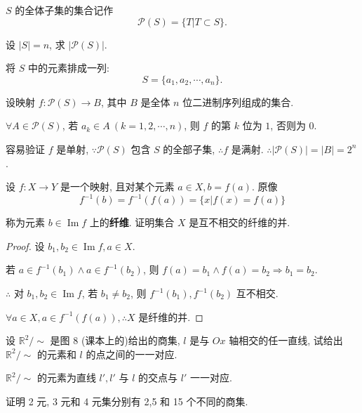 \documentclass{ctexart}
\begin{document}
\begin{exercise}%
    $S$ 的全体子集的集合记作
    \[\mathcal{P}(S)=\{T|T\subset S\}.\]

    设 $|S|=n$, 求 $|\mathcal{P}(S)|$.
\end{exercise}
\begin{solution}
    将 $S$ 中的元素排成一列:
    \[S=\{a_1,a_2,\cdots,a_n\}.\]

    设映射 $f:\mathcal{P}(S)\to B$, 其中 $B$ 是全体 $n$ 位二进制序列组成的集合.

    $\forall A\in\mathcal{P}(S)$, 若 $a_k\in A\ (k=1,2,\cdots,n)$, 则 $f$ 的第 $k$ 位为 $1$, 否则为 $0$.

    容易验证 $f$ 是单射, $\because\mathcal{P}(S)$ 包含 $S$ 的全部子集, $\therefore f$ 是满射. $\therefore|\mathcal{P}(S)|=|B|=2^n$.
\end{solution}
\begin{exercise}%
    设 $f:X\to Y$ 是一个映射, 且对某个元素 $a\in X,b=f(a)$. 原像
    \[f^{-1}(b)=f^{-1}(f(a))=\{x|f(x)=f(a)\}\]

    称为元素 $b\in\operatorname{Im}f$ 上的\textbf{纤维}. 证明集合 $X$ 是互不相交的纤维的并.
\end{exercise}
\begin{proof}
    设 $b_1,b_2\in\operatorname{Im}f,a\in X$.

    若 $a\in f^{-1}(b_1)\land a\in f^{-1}(b_2)$, 则 $f(a)=b_1\land f(a)=b_2\Rightarrow b_1=b_2$.

    $\therefore$ 对 $b_1,b_2\in\operatorname{Im}f$, 若 $b_1\neq b_2$, 则 $f^{-1}(b_1),f^{-1}(b_2)$ 互不相交.

    $\forall a\in X,a\in f^{-1}(f(a)),\therefore X$ 是纤维的并.
\end{proof}
\begin{exercise}%
    设 $\mathbb{R}^2/\sim$ 是图 8 (课本上的)给出的商集, $l$ 是与 $Ox$ 轴相交的任一直线, 试给出 $\mathbb{R}^2/\sim$ 的元素和 $l$ 的点之间的一一对应.
\end{exercise}
\begin{solution}
    $\mathbb{R}^2/\sim$ 的元素为直线 $l',l'$ 与 $l$ 的交点与 $l'$ 一一对应.
\end{solution}
\begin{exercise}%
    证明 2 元, 3 元和 4 元集分别有 2,5 和 15 个不同的商集.
\end{exercise}
\end{document}

